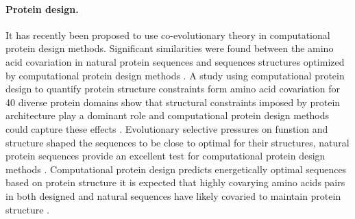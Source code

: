 \paragraph{Protein design.} It has recently been proposed to use co-evolutionary theory in computational protein design methods.
Significant similarities were found between the amino acid covariation in natural protein sequences and sequences structures optimized by computational protein design methods \cite{ollikainen2013computational}.
A study \cite{ollikainen2013computational} using computational protein design to quantify protein structure constraints form amino acid covariation for 40 diverse protein domains show that structural constraints imposed by protein architecture play a dominant role and computational protein design methods could capture these effects \cite{ollikainen2013computational}.
Evolutionary selective pressures on funstion and structure shaped the sequences to be close to optimal for their structures, natural protein sequences provide an excellent test for computational protein design methods \cite{ollikainen2013computational}.
Computational protein design predicts energetically optimal sequences based on protein structure it is expected that highly covarying amino acids pairs in both designed and natural sequences have likely covaried to maintain protein structure \cite{ollikainen2013computational}.



